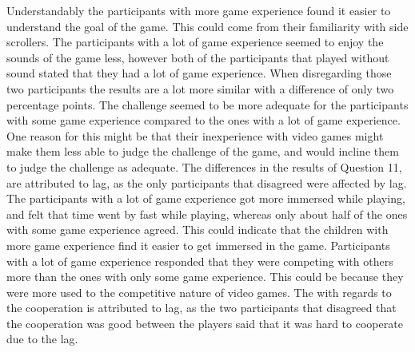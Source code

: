 Understandably the participants with more game experience found it easier to understand the goal of the game. This could come from their familiarity with side scrollers.
The participants with a lot of game experience seemed to enjoy the sounds of the game less, however both of the participants that played without sound stated that they had a lot of game experience. When disregarding those two participants the results are a lot more similar with a difference of only two percentage points.
The challenge seemed to be more adequate for the participants with some game experience compared to the ones with a lot of game experience. One reason for this might be that their inexperience with video games might make them less able to judge the challenge of the game, and would incline them to judge the challenge as adequate. The differences in the results of Question 11, are attributed to lag, as the only participants that disagreed were affected by lag.
The participants with a lot of game experience got more immersed while playing, and felt that time went by fast while playing, whereas only about half of the ones with some game experience agreed. This could indicate that the children with more game experience find it easier to get immersed in the game.
Participants with a lot of game experience responded that they were competing with others more than the ones with only some game experience. This could be because they were more used to the competitive nature of video games.
The with regards to the cooperation is attributed to lag, as the two participants that disagreed that the cooperation was good between the players said that it was hard to cooperate due to the lag.


